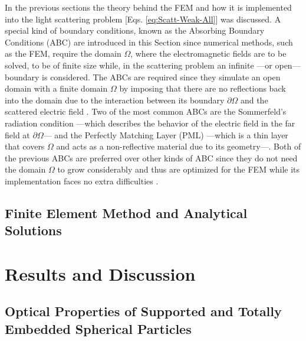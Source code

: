 \documentclass[11pt]{Latex/Classes/PhDthesisPSnPDF}
\begin{document}
        In the previous sections the theory behind the FEM and how it is  implemented into the light scattering problem [Eqs. \eqref{eq:Scatt-Weak-All}] was discussed. A special kind of boundary conditions, known as the Absorbing Boundary Conditions (ABC) are introduced in this Section since numerical methods, such as the FEM, require the domain $\Omega$, where the electromagnetic fields are to be solved, to be of finite size \cite{jin_theory_2010,bondeson_computational_2005} while, in the scattering problem an infinite ---or open--- boundary is considered. The  ABCs are required since they simulate an open domain with a finite domain $\Omega$ by imposing that there are no reflections back into the domain due to the interaction between its boundary $\partial\Omega$ and the scattered electric field \cite{bondeson_computational_2005,jin_theory_2010,chew_complex_1997}. Two of the most common ABCs are the Sommerfeld's radiation condition ---which describes the behavior of the electric field in the far field at $\partial\Omega$--- and the Perfectly Matching Layer (PML) ---which is a thin layer that covers $\Omega$ and acts as a non-reflective material due to its geometry---\cite{jin_theory_2010}.  Both of the previous ABCs are preferred over other kinds of ABC since they do not need the domain $\Omega$ to grow considerably and thus are optimized for the FEM while its implementation faces no extra difficulties \cite{jin_theory_2010}.

         

	\section{Finite Element Method and Analytical Solutions}
		\label{sec:FEM-Mie}
		

%

\chapter{Results and Discussion}
	
	\section{Optical Properties of Supported and Totally Embedded Spherical Particles}
\end{document}
